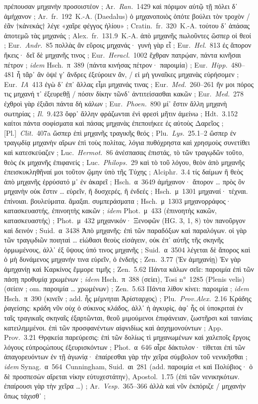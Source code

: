 πρέπουσαν μηχανὴν προσοιστέον ; Ar.~\textit{Ran.}~1429 καὶ πόριμον αὑτῷ τῇ πόλει δ᾽ ἀμήχανον ; Ar.~fr.~192~K.-A. (Daedalus) ὁ μηχανοποιὸς ὁπότε βούλει τὸν τροχὸν / ἐᾶν †κἀνεκάς† λέγε «χαῖρε φέγγος ἡλίου» ; Cratin.~fr.~320~K.-A. τούτου δ᾽ ἁπάσας ἀποτεμῶ τὰς μηχανάς ; Alex.~fr.~131.9~K.-A. ἀπὸ μηχανῆς πωλοῦντες ὥσπερ οἱ θεοί ; Eur.~\textit{Andr.}~85 πολλὰς ἂν εὕροις μηχανάς· γυνὴ γὰρ εἶ ; Eur.~\textit{Hel.}~813 ἐς ἄπορον ἥκεις· δεῖ δὲ μηχανῆς τινος ; Eur.~\textit{Heracl.}~1002 ἔχθραν πατρῴαν, πάντα κινῆσαι πέτρον ; \textit{idem} Hsch.~π~389 (πάντα κινήσας πέτρον· παροιμία) ; Eur.~\textit{Hipp.}~480–481 ἦ τἄρ᾽ ἂν ὀψέ γ᾽ ἄνδρες ἐξεύροιεν ἄν, / εἰ μὴ γυναῖκες μηχανὰς εὑρήσομεν ; Eur.~\textit{IA}~413 ἐγὼ δ᾽ ἐπ᾽ ἄλλας εἶμι μηχανάς τινας ; Eur.~\textit{Med.}~260–261 ἤν μοι πόρος τις μηχανή τ᾽ ἐξευρεθῇ / πόσιν δίκην τῶνδ᾽ ἀντιτείσασθαι κακῶν ; Eur.~\textit{Med.}~278 ἐχθροὶ γὰρ ἐξιᾶσι πάντα δὴ κάλων ; Eur.~\textit{Phoen.}~890 μί᾽ ἔστιν ἄλλη μηχανὴ σωτηρίας ; \textit{Il.}~9.423 ὄφρ᾽ ἄλλην φράζωνται ἐνὶ φρεσὶ μῆτιν ἀμείνω ; Hdt.~3.152 καίτοι πάντα σοφίσματα καὶ πάσας μηχανὰς ἐπεποιήκεε ἐς αὐτοὺς Δαρεῖος ; [Pl.]~\textit{Clit.}~407a ὥσπερ ἐπὶ μηχανῆς τραγικῆς θεός ; Plu.~\textit{Lys.}~25.1–2 ὥσπερ ἐν τραγῳδίᾳ μηχανὴν αἴρων ἐπὶ τοὺς πολίτας, λόγια πυθόχρηστα καὶ χρησμοὺς συνετίθει καὶ κατεσκεύαζεν ; Luc.~\textit{Hermot.}~86 ἀνέσπασας ἐπιστάς, τὸ τῶν τραγῳδῶν τοῦτο, θεὸς ἐκ μηχανῆς ἐπιφανείς ; Luc.~\textit{Philops.}~29 καὶ τὸ τοῦ λόγου, θεὸν ἀπὸ μηχανῆς ἐπεισκυκληθῆναί μοι τοῦτον ᾤμην ὑπὸ τῆς Τύχης ; Alciphr.~3.4 τίς δαίμων ἢ θεὸς ἀπὸ μηχανῆς ἐρρύσατό μ᾽ ἐν ἀκαρεῖ ; Hsch.~α~3649 ἀμήχανον· ἄπορον … πρὸς ὃν μηχανὴν οὐκ ἔστιν … εὑρεῖν, ἢ δυσχερές, ἢ ἐνδεές ; Hsch.~μ~1301 μηχαναί· τέχναι. ἐπίνοιαι. βουλεύματα. ἅμαξαι. συμπεράσματα ; Hsch.~μ~1303 μηχανορράφος· κατασκευαστής, ἐπινοητὴς κακῶν ; \textit{idem} Phot.~μ~433 (ἐπινοητὴς κακῶν, κατασκευαστής) ; Phot.~μ~432 μηχανικόν· Ξενοφῶν (HG. 3, 1, 8) τὸν πανοῦργον καὶ δεινόν ; Suid.~α~3438 Ἀπὸ μηχανῆς: ἐπὶ τῶν παραδόξων καὶ παραλόγων. οἱ γὰρ τῶν τραγῳδιῶν ποιηταὶ … εἰώθασι θεοὺς εἰσάγειν, οὐκ ἐπ᾽ αὐτῆς τῆς σκηνῆς ὁρμωμένους, ἀλλ᾽ ἐξ ὕψους ὑπό τινος μηχανῆς ; Suid.~α~3504 λέγεται δὲ ἄπορος καὶ ὁ μὴ δυνάμενος μηχανήν τινα εὑρεῖν, ὁ ἐνδεής ; Zen.~3.77 (Ἐν ἀμηχανίῃ) Ἐν γὰρ ἀμηχανίῃ καὶ Καρκίνος ἔμμορε τιμῆς ; Zen.~5.62 Πάντα κάλων σεῖε: παροιμία ἐπὶ τῶν πάσῃ προθυμίᾳ χρωμένων ; \textit{idem} Hsch.~π~388 (σείει), Tosi n°~1285 (Plenis velis) (σείειν ; om. παροιμία … χρωμένων) ; Zen.~5.63 Πάντα λίθον κίνει: παροιμία ; \textit{idem} Hsch.~π~390 (κινεῖν ; add. ἧς μέμνηται Ἀρίσταρχος) ; Plu.~\textit{Prov.Alex.}~2.16 Κράδης ῥαγείσης: κράδη νῦν οὐχ ὁ σύκινος κλάδος, ἀλλ᾽ ἡ ἀγκυρὶς, ἀφ᾽ ἧς οἱ ὑποκριταὶ ἐν ταῖς τραγικαῖς σκηναῖς ἐξαρτῶνται, θεοῦ μιμούμενοι ἐπιφάνειαν, ζωστῆρσι καὶ ταινίαις κατειλημμένοι. ἐπὶ τῶν προσφανέντων αἰφνιδίως καὶ ἀσχημονούντων ; App. Prov.~3.21 Θρᾳκεία παρεύρεσις: ἐπὶ τῶν δολίως τὶ μηχανωμένων καὶ χαλεποῖς ἔργοις λόγους εὐπροςώπους ἐξευρισκόντων ; Phot.~α~646 αἶρε δάκτυλον· τίθεται ἐπὶ τῶν ἀπαγορευόντων ἐν τῇ ἀγωνίᾳ· ἐπαίρεσθαι γὰρ τὴν χεῖρα σύμβολον τοῦ νενικῆσθαι ; \textit{idem} Synag.~α~564~Cunningham, Suid.~αι~281 (add. παροιμία et καὶ Πολύβιος· ὁ δὲ προσπεσὼν αἴρεται νίκην εὐτυχεστάτην), Apostol.~1.75 (ἐπὶ τῶν νενικηκότων. ἐπαίρουσι γὰρ τὴν χεῖρα …) ; Ar.~\textit{Vesp.}~365–366 ἀλλὰ καὶ νῦν ἐκπόριζε / μηχανὴν ὅπως τάχισθ᾽ ; 